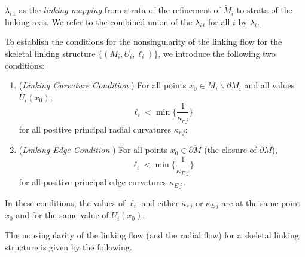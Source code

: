 \documentclass[10pt]{amsart}
\newtheorem{Corollary}[Thm]{Corollary}
\theoremstyle{definition}
\theoremstyle{definition}
\numberwithin{equation}{section}
\newcommand{\bdyM}{\partial M}
\def \gk {\kappa}
\def \gl {\lambda}
\begin{document}
$\gl_{i\, 1}$ as the {\em linking mapping} from strata of the refinement 
of $\tilde M_i$ to strata of the linking axis.  We refer to the 
combined union of the $\gl_{i\, t}$ for all $i$ by $\gl_{t}$.  
\par
To establish the conditions for the nonsingularity of the linking 
flow for the skeletal linking  structure $\{(M_i, U_i, \ell_i)\}$, we 
introduce the following two conditions:
\begin{enumerate}
\item ({\it Linking Curvature Condition} )  For all points $x_0 \in M_i 
\backslash \partial M_i$ and all values $U_i(x_0)$,
\begin{equation*}
\ell_i < \min \{ \frac{1}{\gk_{r\, j}}\} 
\end{equation*}
\noindent for all positive 
principal radial curvatures $\gk_{r\, j}$;
\item ({\it Linking Edge Condition} )  For all points  $x_0 \in 
\overline{\bdyM}$ (the closure of $\bdyM$),
\begin{equation*}
\ell_i < \min \{ \frac{1}{\gk_{E\, j}}\}
\end{equation*}
\noindent for all positive 
principal edge curvatures $\gk_{E\, j}\,$.
\end{enumerate}
In these conditions, the values of $\ell_i$ and either $\gk_{r\, j}$ or 
$\gk_{E\, j}$ are at the same point $x_0$ and for the same value of 
$U_i(x_0)$. \par
The nonsingularity of the linking flow (and the radial flow) for a 
skeletal linking structure is given by the following.

\end{document}
